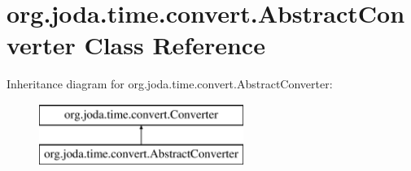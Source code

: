 \hypertarget{classorg_1_1joda_1_1time_1_1convert_1_1_abstract_converter}{\section{org.\-joda.\-time.\-convert.\-Abstract\-Converter Class Reference}
\label{classorg_1_1joda_1_1time_1_1convert_1_1_abstract_converter}
}
Inheritance diagram for org.\-joda.\-time.\-convert.\-Abstract\-Converter\-:\begin{figure}[H]
\begin{center}
\leavevmode
\includegraphics[height=2.000000cm]{classorg_1_1joda_1_1time_1_1convert_1_1_abstract_converter}
\end{center}
\end{figure}
